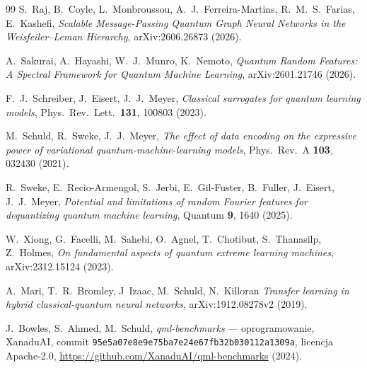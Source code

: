 \documentclass[11pt, a4paper]{article}
\begin{document}
\begin{thebibliography}{99}
S.~Raj, B.~Coyle, L.~Monbroussou, A.~J.~Ferreira-Martins, R.~M.~S.~Farias, E.~Kashefi,
\emph{Scalable Message-Passing Quantum Graph Neural Networks in the Weisfeiler--Leman Hierarchy},
arXiv:2606.26873 (2026).

A.~Sakurai, A.~Hayashi, W.~J.~Munro, K.~Nemoto,
\emph{Quantum Random Features: A Spectral Framework for Quantum Machine Learning},
arXiv:2601.21746 (2026).

F.~J.~Schreiber, J.~Eisert, J.~J.~Meyer,
\emph{Classical surrogates for quantum learning models},
Phys.\ Rev.\ Lett.\ \textbf{131}, 100803 (2023).

M.~Schuld, R.~Sweke, J.~J.~Meyer,
\emph{The effect of data encoding on the expressive power of variational quantum-machine-learning models},
Phys.\ Rev.\ A \textbf{103}, 032430 (2021).

R.~Sweke, E.~Recio-Armengol, S.~Jerbi, E.~Gil-Fuster, B.~Fuller, J.~Eisert, J.~J.~Meyer,
\emph{Potential and limitations of random Fourier features for dequantizing quantum machine learning},
Quantum \textbf{9}, 1640 (2025).

W.~Xiong, G.~Facelli, M.~Sahebi, O.~Agnel, T.~Chotibut, S.~Thanasilp, Z.~Holmes,
\emph{On fundamental aspects of quantum extreme learning machines},
arXiv:2312.15124 (2023).

A.~Mari, T.~R.~Bromley, J~Izaac, M.~Schuld, N.~Killoran
\emph{Transfer learning in hybrid classical-quantum neural networks},
arXiv:1912.08278v2 (2019).

J.~Bowles, S.~Ahmed, M.~Schuld,
\emph{qml-benchmarks} --- oprogramowanie, XanaduAI,
commit \texttt{95e5a07e8e9e75ba7e24e67fb32b030112a1309a}, licencja Apache-2.0,
\url{https://github.com/XanaduAI/qml-benchmarks} (2024).

\end{thebibliography}
\end{document}
